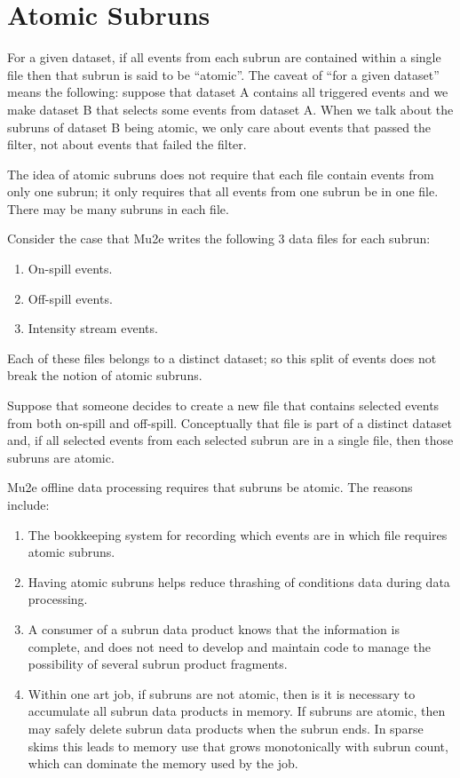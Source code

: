 \chapter{Atomic Subruns}
\label{ch:AtomicSubrunsExtendedDefinition}

For a given dataset, if all events from each subrun are contained within a single \art file
then that subrun is said to be ``atomic''.
The caveat of ``for a given dataset'' means the following:
suppose that dataset A contains all triggered events
and we make dataset B that selects some events from dataset A.
When we talk about the subruns of dataset B being atomic, we only care about events
that passed the filter, not about events that failed the filter.

The idea of atomic subruns does not require that each file contain events
from only one subrun;
it only requires that all events from one subrun be in one file.
There may be many subruns in each file.

Consider the case that Mu2e writes the following 3 data files for each subrun:
\begin{enumerate}
\item On-spill events.
\item Off-spill events.
\item Intensity stream events.
\end{enumerate}
Each of these files belongs to a distinct dataset; so this split of events does not break the notion
of atomic subruns.

Suppose that someone decides to create a new file that contains selected events from both on-spill
and off-spill.  Conceptually that file is part of a distinct dataset and, if all selected events from
each selected subrun are in a single file, then those subruns are atomic.

Mu2e offline data processing requires that subruns be atomic.  The reasons include:
\begin{enumerate}
\item The bookkeeping system for recording which events are in which file requires atomic subruns.
\item Having atomic subruns helps reduce thrashing of conditions data during data processing.
\item A consumer of a subrun data product knows that the information is complete, and does not need
  to develop and maintain code to manage the possibility of several subrun product fragments.
\item Within one art job, if subruns are not atomic,
  then is it is necessary to accumulate all subrun data products in memory.
  If subruns are atomic, then \art may safely delete subrun data products when the subrun ends.
  In sparse skims this leads to memory use that grows monotonically with subrun count,
  which can dominate the memory used by the job.
\end{enumerate}

